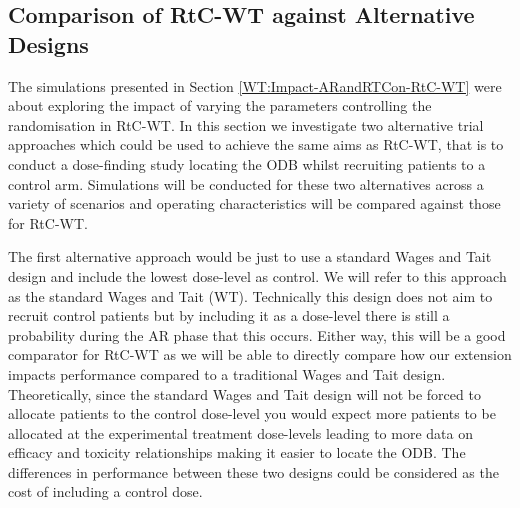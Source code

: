 \subsection{Comparison of RtC-WT against Alternative Designs }
\label{WT:CompAltDesigns}

The simulations presented in Section \ref{WT:Impact-ARandRTCon-RtC-WT} were about exploring the impact of varying the parameters controlling the randomisation in RtC-WT. In this section we investigate two alternative trial approaches which could be used to achieve the same aims as RtC-WT, that is to conduct a dose-finding study locating the ODB whilst recruiting patients to a control arm. Simulations will be conducted for these two alternatives across a variety of scenarios and operating characteristics will be compared against those for RtC-WT.       

The first alternative approach would be just to use a standard Wages and Tait design and include the lowest dose-level as control. We will refer to this approach as the standard Wages and Tait (WT). Technically this design does not aim to recruit control patients but by including it as a dose-level there is still a probability during the AR phase that this occurs. Either way, this will be a good comparator for RtC-WT as we will be able to directly compare how our extension impacts performance compared to a traditional Wages and Tait design. Theoretically, since the standard Wages and Tait design will not be forced to allocate patients to the control dose-level you would expect more patients to be allocated at the experimental treatment dose-levels leading to more data on efficacy and toxicity relationships making it easier to locate the ODB. The differences in performance between these two designs could be considered as the cost of including a control dose. 

